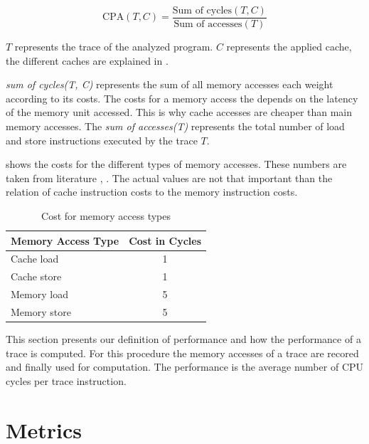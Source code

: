 \documentclass[onecolumn, openright, master, english, signatures]{dbrgrptt}
\begin{document}
\begin{equation}\label{equ:performance-cpa}
\text{CPA}(T,C) = \frac{\text{Sum of cycles}(T, C)}{\text{Sum of accesses}(T)}
\end{equation}

$T$ represents the \ac{trace} of the analyzed program. $C$ represents the applied cache, the different caches are explained in .

\emph{sum of cycles(T, C)} represents the sum of all memory accesses each weight according to its costs. The costs for a memory access the depends on the latency of the memory unit accessed. This is why cache accesses are cheaper than main memory accesses. The \emph{sum of accesses(T)} represents the total number of load and store instructions executed by the \ac{trace} $T$.

 shows the costs for the different types of memory accesses. These numbers are taken from literature \cite{drepper2007every}, \cite{skylake}. The actual values are not that important than the relation of cache instruction costs to the memory instruction costs.

\begin{table}[!ht]
  \centering
  \begin{tabular}{lc}
  \hline
  Memory Access Type & Cost in Cycles \\
  \hline
  Cache  load  & 1 \\
  Cache  store & 1 \\
  Memory load  & 5 \\
  Memory store & 5 \\
  \hline
  \end{tabular}
  \caption{Cost for memory access types}
  \label{tab:memory-access-cost}
\end{table}

This section presents our definition of performance and how the performance of a trace is computed. For this procedure the memory accesses of a  \ac{trace} are recored and finally used for computation. The performance is the average number of \ac{CPU} cycles per \ac{trace} instruction.


\section{Metrics}\label{sec:metrics}
\end{document}
